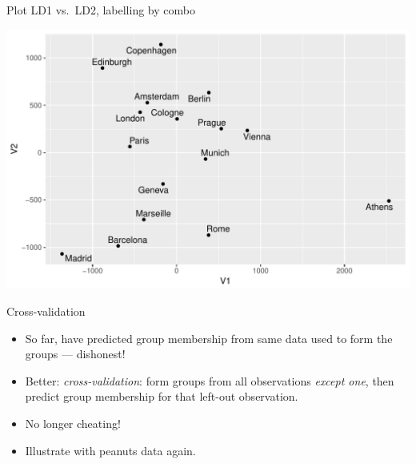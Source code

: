   
\begin{frame}[fragile]{Plot LD1 vs.\ LD2, labelling by combo}
  
\begin{knitrout}
\color{fgcolor}\begin{kframe}
\begin{alltt}
\hlkwb{=}\hlstd{(}\hlopt{+}
  \hlstd{()}\hlopt{+}\hlstd{()}\hlopt{+}\hlstd{(}
\end{alltt}
\end{kframe}
\includegraphics[width=\maxwidth]{figure/unnamed-chunk-15-1} 

\end{knitrout}
  
\end{frame}

\begin{frame}[fragile]{Cross-validation}
  
  \begin{itemize}
  \item So far, have predicted group membership from same data used to
    form the groups --- dishonest!
  \item Better: \emph{cross-validation}: form groups from all
    observations \emph{except one}, then predict group membership for
    that left-out observation.
  \item No longer cheating!
  \item Illustrate with peanuts data again.
  \end{itemize}
  
\end{frame}

